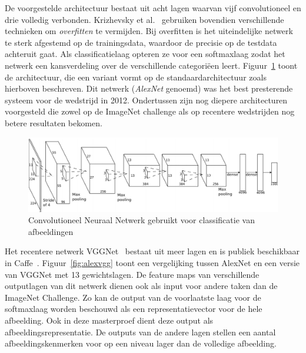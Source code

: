 De voorgestelde architectuur bestaat uit acht lagen waarvan vijf convolutioneel en drie volledig verbonden. Krizhevsky et al.~\cite{Krizhevsky2012a} gebruiken bovendien verschillende technieken om \emph{overfitten} te vermijden. Bij overfitten is het uiteindelijke netwerk te sterk afgestemd op de trainingsdata, waardoor de precisie op de testdata achteruit gaat. Als classificatielaag opteren ze voor een softmaxlaag zodat het netwerk een kansverdeling over de verschillende categori\"een leert. Figuur~\ref{fig:AlexNet} toont de architectuur, die een variant vormt op de standaardarchitectuur zoals hierboven beschreven. Dit netwerk (\emph{AlexNet} genoemd) was het best presterende systeem voor de wedstrijd in 2012. Ondertussen zijn nog diepere architecturen voorgesteld die zowel op de ImageNet challenge als op recentere wedstrijden nog betere resultaten bekomen.

\begin{figure}[tb]
	\centering
	\includegraphics[width=\linewidth]{Images/cnn.PNG}
	\caption[Convolutioneel Neuraal Netwerk gebruikt voor classificatie van afbeeldingen]{Convolutioneel Neuraal Netwerk gebruikt voor classificatie van afbeeldingen~\cite{Krizhevsky2012a}}
	\label{fig:AlexNet}
\end{figure}

Het recentere netwerk VGGNet~\cite{Arge2015} bestaat uit meer lagen en is publiek beschikbaar in Caffe~\cite{Jia2014}.
Figuur~\ref{fig:alexvgg} toont een vergelijking tussen AlexNet en een versie van VGGNet met 13 gewichtslagen. De feature maps van verschillende outputlagen van dit netwerk dienen ook als input voor andere taken dan de ImageNet Challenge. Zo kan de output van de voorlaatste laag voor de softmaxlaag worden beschouwd als een representatievector voor de hele afbeelding. Ook in deze masterproef dient deze output als afbeeldingsrepresentatie. De outputs van de andere lagen stellen een aantal afbeeldingskenmerken voor op een niveau lager dan de volledige afbeelding.

